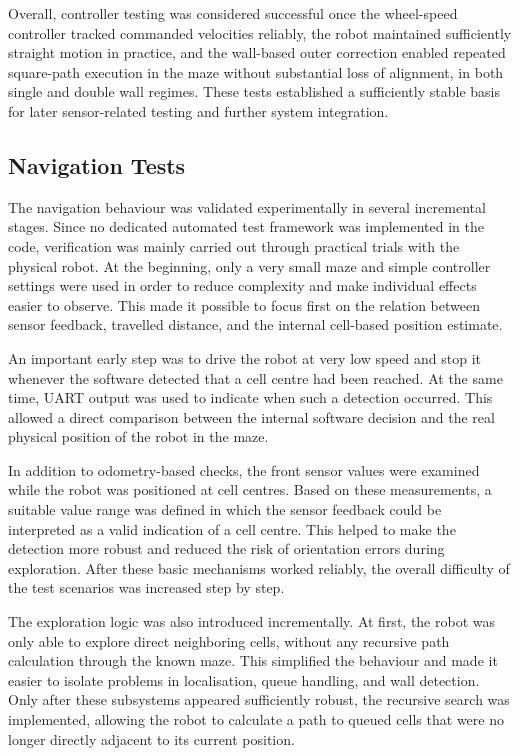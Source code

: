Overall, controller testing was considered successful once the wheel-speed controller tracked commanded velocities reliably, the robot maintained sufficiently straight motion in practice, and the wall-based outer correction enabled repeated square-path execution in the maze without substantial loss of alignment, in both single and double wall regimes. These tests established a sufficiently stable basis for later sensor-related testing and further system integration.

\subsection{Navigation Tests}

The navigation behaviour was validated experimentally in several incremental stages. Since no dedicated automated test framework was implemented in the code, verification was mainly carried out through practical trials with the physical robot. At the beginning, only a very small maze and simple controller settings were used in order to reduce complexity and make individual effects easier to observe. This made it possible to focus first on the relation between sensor feedback, travelled distance, and the internal cell-based position estimate.

An important early step was to drive the robot at very low speed and stop it whenever the software detected that a cell centre had been reached. At the same time, UART output was used to indicate when such a detection occurred. This allowed a direct comparison between the internal software decision and the real physical position of the robot in the maze.

In addition to odometry-based checks, the front sensor values were examined while the robot was positioned at cell centres. Based on these measurements, a suitable value range was defined in which the sensor feedback could be interpreted as a valid indication of a cell centre. This helped to make the detection more robust and reduced the risk of orientation errors during exploration. After these basic mechanisms worked reliably, the overall difficulty of the test scenarios was increased step by step.

The exploration logic was also introduced incrementally. At first, the robot was only able to explore direct neighboring cells, without any recursive path calculation through the known maze. This simplified the behaviour and made it easier to isolate problems in localisation, queue handling, and wall detection. Only after these subsystems appeared sufficiently robust, the recursive search was implemented, allowing the robot to calculate a path to queued cells that were no longer directly adjacent to its current position.

